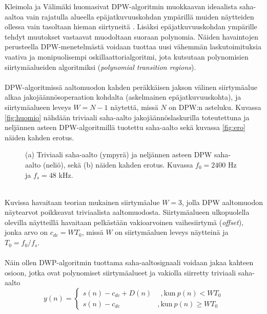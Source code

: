 \documentclass[finnish,12pt,a4paper,pdftex]{article} %
\begin{document}
Kleimola ja Välimäki huomasivat DPW-algoritmin muokkaavan ideaalista saha-aaltoa vain rajatulla alueella epäjatkuvuuskohdan ympärillä muiden näytteiden ollessa vain tasoltaan hieman siirtyneitä \cite{Kleimola2012}. Lisäksi epäjatkuvuuskohdan ympärille tehdyt muutokset vastaavat muodoltaan suoraan polynomia. Näiden havaintojen perusteella  DPW-menetelmästä voidaan tuottaa uusi vähemmän laskutoimituksia vaativa ja monipuolisempi oskillaattorialgoritmi, jota kutsutaan polynomisien siirtymäalueiden algoritmiksi (\textit{polynomial transition regions}). \cite{Kleimola2013, Kleimola2012} \\\\
DPW-algoritmissä aaltomuodon kahden peräkkäisen jakson välinen siirtymäalue alkaa jakojäännösoperaation kohdalta (askelmainen epäjatkuvuuskohta), ja siirtymäalueen leveys $W = N-1$ näytettä, missä $N$ on DPW:n asteluku. Kuvassa \ref{fig:huomio} nähdään triviaali saha-aalto  jakojäännöslaskurilla toteutettuna ja neljännen asteen DPW-algoritmillä tuotettu saha-aalto sekä kuvassa \ref{fig:ero} näiden kahden erotus.
\vspace{2mm}
\begin{figure}[h] 
\begin{center}
\caption{(a) Triviaali saha-aalto (ympyrä) ja neljännen asteen DPW saha-aalto (neliö), sekä (b) näiden kahden erotus. Kuvassa $f_0 = 2400 $ Hz ja $f_s = 48$ kHz.}
\label{fig:ptr}
\end{center}
\end{figure} \\
Kuvissa havaitaan teorian mukainen siirtymäalue $W = 3$, jolla DPW aaltomuodon näytearvot poikkeavat triviaalista aaltomuodosta. Siirtymäalueen ulkopuolella olevilla näytteillä havaitaan pelkästään vakioarvoinen vaihesiirtymä (\textit{offset}), jonka arvo on $c_{dc} = WT_0$, missä $W$ on siirtymäaluen leveys näytteinä ja $T_0 = f_0/f_s$. \cite{Kleimola2012} \\\\
Näin ollen DWP-algoritmin tuottama saha-aaltosignaali voidaan jakaa kahteen osioon, jotka ovat polynomiset siirtymäalueet ja vakiolla siirretty triviaali saha-aalto
\begin{equation}
y(n) = \left\{
  \begin{array}{lr}
    s(n) - c_{dc} + D(n) 	& \ \ , \text{kun} \ p(n) < WT_0 \\
    s(n) - c_{dc} 		 	& ,  \text{kun} \ p(n) \geq WT_0
  \end{array}
\right.
\end{equation}
\end{document}

